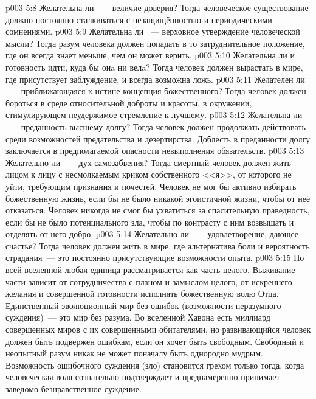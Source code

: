 \vs p003 5:8 Желательна ли ~--- величие доверия? Тогда человеческое существование должно постоянно сталкиваться с незащищённостью и периодическими сомнениями.
\vs p003 5:9 Желательна ли ~--- верховное утверждение человеческой мысли? Тогда разум человека должен попадать в то затруднительное положение, где он всегда знает меньше, чем он может верить.
\vs p003 5:10 Желательна ли  и готовность идти, куда бы онa ни велa? Тогда человек должен вырастать в мире, где присутствует заблуждение, и всегда возможна ложь.
\vs p003 5:11 Желателен ли ~--- приближающаяся к истине концепция божественного? Тогда человек должен бороться в среде относительной доброты и красоты, в окружении, стимулирующем неудержимое стремление к лучшему.
\vs p003 5:12 Желательна ли ~--- преданность высшему долгу? Тогда человек должен продолжать действовать среди возможностей предательства и дезертирства. Доблесть в преданности долгу заключается в предполагаемой опасности невыполнения обязательств.
\vs p003 5:13 Желательно ли ~--- дух самозабвения? Тогда смертный человек должен жить лицом к лицу с несмолкаемым криком собственного <<я>>, от которого не уйти, требующим признания и почестей. Человек не мог бы активно избирать божественную жизнь, если бы не было никакой эгоистичной жизни, чтобы от неё отказаться. Человек никогда не смог бы ухватиться за спасительную праведность, если бы не было потенциального зла, чтобы по контрасту с ним возвышать и отделять от него добро.
\vs p003 5:14 Желательно ли ~--- удовлетворение, дающее счастье? Тогда человек должен жить в мире, где альтернатива боли и вероятность страдания~--- это постоянно присутствующие возможности опыта.
\vs p003 5:15 \pc По всей вселенной любая единица рассматривается как часть целого. Выживание части зависит от сотрудничества с планом и замыслом целого, от искреннего желания и совершенной готовности исполнять божественную волю Отца. Единственный эволюционный мир без ошибок (возможности неразумного суждения)~--- это мир без  разума. Во вселенной Хавона есть миллиард совершенных миров с их совершенными обитателями, но развивающийся человек должен быть подвержен ошибкам, если он хочет быть свободным. Свободный и неопытный разум никак не может поначалу быть однородно мудрым. Возможность ошибочного суждения (зло) становится грехом только тогда, когда человеческая воля сознательно подтверждает и преднамеренно принимает заведомо безнравственное суждение.
